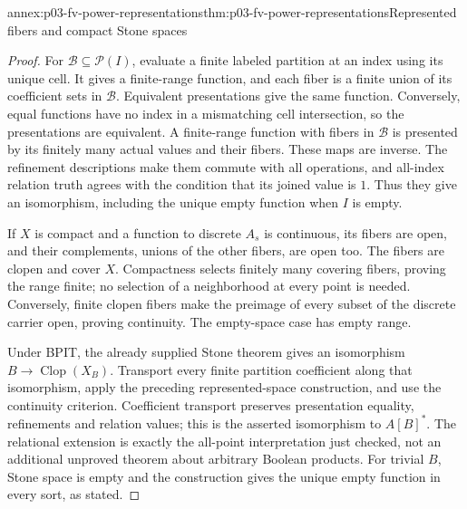 \begin{annexitem}{annex:p03-fv-power-representations}{thm:p03-fv-power-representations}{Represented fibers and compact Stone spaces}
\begin{proof}
For \(\mathcal B\subseteq\mathcal P(I)\), evaluate a finite labeled
partition at an index using its unique cell. It gives a finite-range
function, and each fiber is a finite union of its coefficient sets in
\(\mathcal B\). Equivalent presentations give the same function.
Conversely, equal functions have no index in a mismatching cell intersection,
so the presentations are equivalent. A finite-range function with fibers
in \(\mathcal B\) is presented by its finitely many actual values and
their fibers. These maps are inverse. The refinement descriptions make them
commute with all operations, and all-index relation truth agrees with the
condition that its joined value is \(1\). Thus they give an isomorphism,
including the unique empty function when \(I\) is empty.

If \(X\) is compact and a function to discrete \(A_s\) is continuous,
its fibers are open, and their complements, unions of the other fibers,
are open too. The fibers are clopen and cover \(X\). Compactness selects
finitely many covering fibers, proving the range finite; no selection of a
neighborhood at every point is needed. Conversely, finite clopen fibers
make the preimage of every subset of the discrete carrier open, proving
continuity. The empty-space case has empty range.

Under BPIT, the already supplied Stone theorem gives an isomorphism
\(B\to\operatorname{Clop}(X_B)\). Transport every finite partition
coefficient along that isomorphism, apply the preceding represented-space
construction, and use the continuity criterion. Coefficient transport
preserves presentation equality, refinements and relation values; this is
the asserted isomorphism to \(A[B]^*\). The relational extension is
exactly the all-point interpretation just checked, not an additional
unproved theorem about arbitrary Boolean products. For trivial \(B\),
Stone space is empty and the construction gives the unique empty function
in every sort, as stated.
\end{proof}
\end{annexitem}

